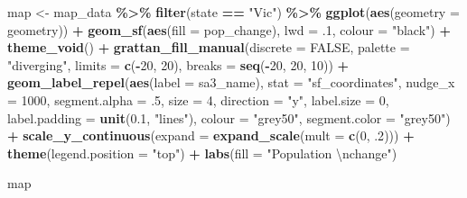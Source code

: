 \documentclass[
]{book}
\newenvironment{Shaded}{\begin{snugshade}}{\end{snugshade}}
\newcommand{\CharTok}[1]{\textcolor[rgb]{0.31,0.60,0.02}{#1}}
\newcommand{\DataTypeTok}[1]{\textcolor[rgb]{0.13,0.29,0.53}{#1}}
\newcommand{\DecValTok}[1]{\textcolor[rgb]{0.00,0.00,0.81}{#1}}
\newcommand{\FloatTok}[1]{\textcolor[rgb]{0.00,0.00,0.81}{#1}}
\newcommand{\KeywordTok}[1]{\textcolor[rgb]{0.13,0.29,0.53}{\textbf{#1}}}
\newcommand{\NormalTok}[1]{#1}
\newcommand{\OperatorTok}[1]{\textcolor[rgb]{0.81,0.36,0.00}{\textbf{#1}}}
\newcommand{\OtherTok}[1]{\textcolor[rgb]{0.56,0.35,0.01}{#1}}
\newcommand{\StringTok}[1]{\textcolor[rgb]{0.31,0.60,0.02}{#1}}
\begin{document}
\begin{Shaded}
\begin{Highlighting}[]
\NormalTok{map \textless{}{-}}\StringTok{ }\NormalTok{map\_data }\OperatorTok{\%\textgreater{}\%}\StringTok{ }
\StringTok{        }\KeywordTok{filter}\NormalTok{(state }\OperatorTok{==}\StringTok{ "Vic"}\NormalTok{) }\OperatorTok{\%\textgreater{}\%}\StringTok{ }
\StringTok{        }\KeywordTok{ggplot}\NormalTok{(}\KeywordTok{aes}\NormalTok{(}\DataTypeTok{geometry =}\NormalTok{ geometry)) }\OperatorTok{+}
\StringTok{        }\KeywordTok{geom\_sf}\NormalTok{(}\KeywordTok{aes}\NormalTok{(}\DataTypeTok{fill =}\NormalTok{ pop\_change),}
                \DataTypeTok{lwd =} \FloatTok{.1}\NormalTok{,}
                \DataTypeTok{colour =} \StringTok{"black"}\NormalTok{) }\OperatorTok{+}
\StringTok{        }\KeywordTok{theme\_void}\NormalTok{() }\OperatorTok{+}
\StringTok{        }\KeywordTok{grattan\_fill\_manual}\NormalTok{(}\DataTypeTok{discrete =} \OtherTok{FALSE}\NormalTok{, }
                            \DataTypeTok{palette =} \StringTok{"diverging"}\NormalTok{,}
                            \DataTypeTok{limits =} \KeywordTok{c}\NormalTok{(}\OperatorTok{{-}}\DecValTok{20}\NormalTok{, }\DecValTok{20}\NormalTok{),}
                            \DataTypeTok{breaks =} \KeywordTok{seq}\NormalTok{(}\OperatorTok{{-}}\DecValTok{20}\NormalTok{, }\DecValTok{20}\NormalTok{, }\DecValTok{10}\NormalTok{)) }\OperatorTok{+}
\StringTok{  }\KeywordTok{geom\_label\_repel}\NormalTok{(}\KeywordTok{aes}\NormalTok{(}\DataTypeTok{label =}\NormalTok{ sa3\_name),}
                  \DataTypeTok{stat =} \StringTok{"sf\_coordinates"}\NormalTok{, }\DataTypeTok{nudge\_x =} \DecValTok{1000}\NormalTok{, }\DataTypeTok{segment.alpha =} \FloatTok{.5}\NormalTok{,}
                  \DataTypeTok{size =} \DecValTok{4}\NormalTok{, }
                  \DataTypeTok{direction =} \StringTok{"y"}\NormalTok{,}
                  \DataTypeTok{label.size =} \DecValTok{0}\NormalTok{, }
                  \DataTypeTok{label.padding =} \KeywordTok{unit}\NormalTok{(}\FloatTok{0.1}\NormalTok{, }\StringTok{"lines"}\NormalTok{),}
                  \DataTypeTok{colour =} \StringTok{"grey50"}\NormalTok{,}
                  \DataTypeTok{segment.color =} \StringTok{"grey50"}\NormalTok{) }\OperatorTok{+}\StringTok{ }
\StringTok{  }\KeywordTok{scale\_y\_continuous}\NormalTok{(}\DataTypeTok{expand =} \KeywordTok{expand\_scale}\NormalTok{(}\DataTypeTok{mult =} \KeywordTok{c}\NormalTok{(}\DecValTok{0}\NormalTok{, }\FloatTok{.2}\NormalTok{))) }\OperatorTok{+}\StringTok{ }
\StringTok{  }\KeywordTok{theme}\NormalTok{(}\DataTypeTok{legend.position =} \StringTok{"top"}\NormalTok{) }\OperatorTok{+}\StringTok{ }
\StringTok{  }\KeywordTok{labs}\NormalTok{(}\DataTypeTok{fill =} \StringTok{"Population }\CharTok{\textbackslash{}n}\StringTok{change"}\NormalTok{)}

\NormalTok{map}
\end{Highlighting}
\end{Shaded}
\end{document}
